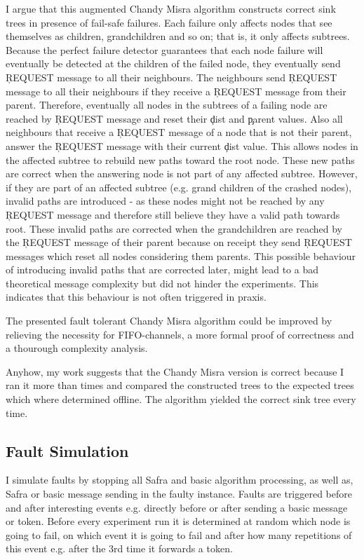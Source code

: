   I argue that this augmented Chandy Misra algorithm constructs correct sink trees in presence of fail-safe failures. 
  Each failure only affects nodes that see themselves as children, grandchildren and so on; that is, it only affects subtrees.
  Because the perfect failure detector guarantees that each node failure will eventually be detected at the children of the failed node, they eventually send \c{REQUEST} message to all their neighbours.
  The neighbours send \c{REQUEST} message to all their neighbours if they receive a \c{REQUEST} message from their parent. 
  Therefore, eventually all nodes in the subtrees of a failing node are reached by \c{REQUEST} message and reset their \c{dist} and \c{parent} values.
  Also all neighbours that receive a \c{REQUEST} message of a node that is not their parent, answer the \c{REQUEST} message with their current \c{dist} value.
  This allows nodes in the affected subtree to rebuild new paths toward the root node.
  These new paths are correct when the answering node is not part of any affected subtree.
  However, if they are part of an affected subtree (e.g. grand children of the crashed nodes), invalid paths are introduced - as these nodes might not be reached by any \c{REQUEST} message and therefore still believe they have a valid path towards root.
  These invalid paths are corrected when the grandchildren are reached by the \c{REQUEST} message of their parent because on receipt they send \c{REQUEST} messages which reset all nodes considering them
  parents. 
  This possible behaviour of introducing invalid paths that are corrected later, might lead to a bad theoretical message complexity but did not hinder the experiments.
  This indicates that this behaviour is not often triggered in praxis.
  
  The presented fault tolerant Chandy Misra algorithm could be improved by relieving the necessity for FIFO-channels, a more formal proof of correctness and a thourough complexity analysis.

  Anyhow, my work suggests that the Chandy Misra version is correct because I ran it more than %
  times and compared the constructed trees to the expected trees which where determined offline. The algorithm yielded the correct sink tree every time.
  
  
  
\subsection{Fault Simulation}
	I simulate faults by stopping all Safra and basic algorithm processing, as well as, Safra or basic message sending in the faulty instance. Faults are triggered before and after interesting events e.g. directly before or after sending a basic message or token. 
	Before every experiment run it is determined at random which node is going to fail, on which event it is going to fail and after how many repetitions of this event e.g. after the 3rd time it forwards a token.
	
